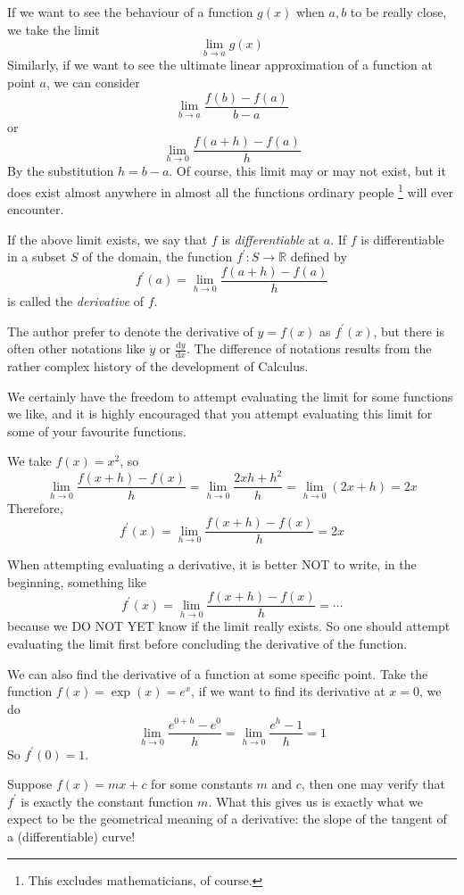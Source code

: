 If we want to see the behaviour of a function $g(x)$ when $a,b$ to be really close, we take the limit
$$\lim_{b\to a}g(x)$$
Similarly, if we want to see the ultimate linear approximation of a function at point $a$, we can consider 
$$\lim_{b\to a}\frac{f(b)-f(a)}{b-a}$$
or
$$\lim_{h\to 0}\frac{f(a+h)-f(a)}{h}$$
By the substitution $h=b-a$. Of course, this limit may or may not exist, but it does exist almost anywhere in almost all the functions ordinary people
\footnote{This excludes mathematicians, of course.}
will ever encounter.
\begin{definition}
    If the above limit exists, we say that $f$ is \textit{differentiable} at $a$.
    If $f$ is differentiable in a subset $S$ of the domain, the function $f^\prime:S\to\mathbb R$ defined by 
    $$f^\prime(a)=\lim_{h\to 0}\frac{f(a+h)-f(a)}{h}$$
    is called the \textit{derivative} of $f$.
\end{definition}
\begin{remark}
    The author prefer to denote the derivative of $y=f(x)$ as $f^\prime(x)$, but there is often other notations like $\dot{y}$ or $\frac{\mathrm dy}{\mathrm dx}$.
    The difference of notations results from the rather complex history of the development of Calculus.
\end{remark}
We certainly have the freedom to attempt evaluating the limit for some functions we like, and it is highly encouraged that you attempt evaluating this limit for some of your favourite functions.
\begin{example}
    We take $f(x)=x^2$, so
    $$\lim_{h\to0}\frac{f(x+h)-f(x)}{h}=\lim_{h\to0}\frac{2xh+h^2}{h}=\lim_{h\to0}(2x+h)=2x$$
    Therefore,
    $$f^\prime(x)=\lim_{h\to0}\frac{f(x+h)-f(x)}{h}=2x$$
\end{example}
\begin{remark}
    When attempting evaluating a derivative, it is better NOT to write, in the beginning, something like
    $$f^\prime(x)=\lim_{h\to0}\frac{f(x+h)-f(x)}{h}=\cdots$$
    because we DO NOT YET know if the limit really exists. So one should attempt evaluating the limit first before concluding the derivative of the function.
\end{remark}
\begin{example}
    We can also find the derivative of a function at some specific point. Take the function $f(x)=\exp(x)=e^x$, if we want to find its derivative at $x=0$, we do
    $$\lim_{h\to0}\frac{e^{0+h}-e^0}{h}=\lim_{h\to0}\frac{e^h-1}{h}=1$$
    So $f^\prime(0)=1$.
\end{example}
Suppose $f(x)=mx+c$ for some constants $m$ and $c$, then one may verify that $f^\prime$ is exactly the constant function $m$. What this gives us is exactly what we expect to be the geometrical meaning of a derivative: the slope of the tangent of a (differentiable) curve!